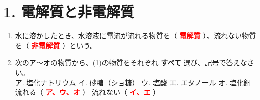 \section*{1. 電解質と非電解質}
\begin{enumerate}
    \item 水に溶かしたとき、水溶液に電流が流れる物質を（ \textcolor{red}{\textbf{電解質}} ）、流れない物質を（ \textcolor{red}{\textbf{非電解質}} ）という。
    \item 次のア～オの物質から、(1)の物質をそれぞれ \textbf{すべて} 選び、記号で答えなさい。\\[0.2cm]
    ア. 塩化ナトリウム \hspace{0.5cm} イ. 砂糖（ショ糖） \hspace{0.5cm} ウ. 塩酸 \hspace{0.5cm} エ. エタノール \hspace{0.5cm} オ. 塩化銅\\[0.2cm]
    流れる（ \textcolor{red}{\textbf{ア、ウ、オ}} ） \hspace{1cm} 流れない（ \textcolor{red}{\textbf{イ、エ}} ）
\end{enumerate}

